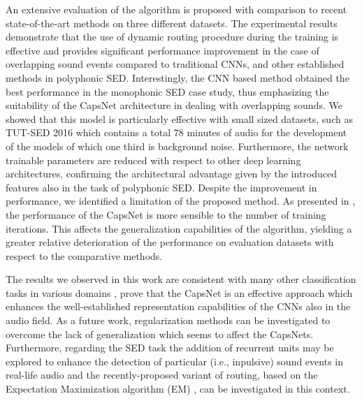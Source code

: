 An extensive evaluation of the algorithm is proposed with comparison to recent state-of-the-art methods on three different datasets. The experimental results demonstrate that the use of dynamic routing procedure during the training is effective and provides significant performance improvement in the case of overlapping sound events compared to traditional CNNs, and other established methods in polyphonic SED. Interestingly, the CNN based method obtained the best performance in the monophonic SED case study, thus emphasizing the suitability of the CapsNet architecture in dealing with overlapping sounds.
We showed that this model is particularly effective with small sized datasets, such as TUT-SED 2016 which contains a total 78 minutes of audio for the development of the models of which one third is background noise.
Furthermore, the network trainable parameters are reduced with respect to other deep learning architectures, confirming the architectural advantage given by the introduced features also in the task of polyphonic SED. 
Despite the improvement in performance, we identified a limitation of the proposed method. As presented in , the performance of the CapsNet is more sensible to the number of training iterations. This affects the generalization capabilities of the algorithm, yielding a greater relative deterioration of the performance on evaluation datasets with respect to the comparative methods.

The results we observed in this work are consistent with many other classification tasks in various domains \cite{deng2018hyper, shen2018dynamic, jalal2018american}, prove that the CapsNet is an effective approach which enhances the well-established representation capabilities of the CNNs also in the audio field. As a future work, regularization methods can be investigated to overcome the lack of generalization which seems to affect the CapsNets. Furthermore, regarding the SED task the addition of recurrent units may be explored to enhance the detection of particular (i.e., inpulsive) sound events in real-life audio and the recently-proposed variant of routing, based on the Expectation Maximization algorithm (EM) \cite{hinton2018matrix}, can be investigated in this context.
